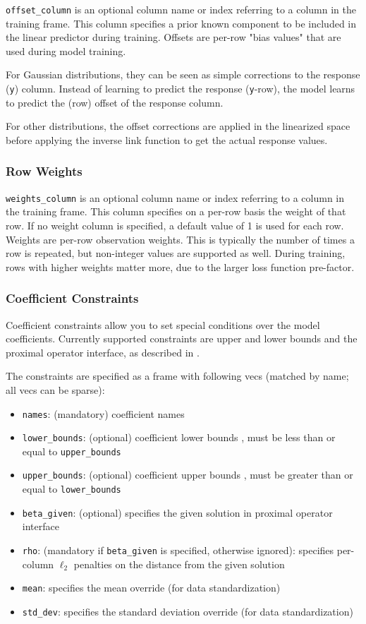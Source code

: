 \texttt{offset\_column} is an optional column name or index referring to a column in the training frame. This column specifies a prior known component to be included in the linear predictor during training. Offsets are per-row "bias values" that are used during model training. 

For Gaussian distributions, they can be seen as simple corrections to the response (\texttt{y}) column. Instead of learning to predict the response (\texttt{y}-row), the model learns to predict the (row) offset of the response column. 

For other distributions, the offset corrections are applied in the linearized space before applying the inverse link function to get the actual response values.  

\subsubsection{Row Weights}
\texttt{weights\_column} is an optional column name or index referring to a column in the training frame. This column specifies on a per-row basis the weight of that row.  If no weight column is specified, a default value of 1 is used for each row. Weights are per-row observation weights. This is typically the number of times a row is repeated, but non-integer values are supported as well. During training, rows with higher weights matter more, due to the larger loss function pre-factor.

\subsubsection{Coefficient Constraints}
Coefficient constraints allow you to set special conditions over the model coefficients. Currently supported
constraints are upper and lower bounds and the proximal operator interface, as described in .

The constraints are specified as a frame with following vecs (matched by name; all vecs can be sparse):

\begin{itemize}
\item \texttt{names}: (mandatory) coefficient names
\item \texttt{lower\_bounds}: (optional) coefficient lower bounds , must be less than or equal to \texttt{upper\_bounds}
\item \texttt{upper\_bounds}: (optional) coefficient upper bounds , must be greater than or equal to \texttt{lower\_bounds}
\item \texttt{beta\_given}: (optional) specifies the given solution in proximal operator interface
\item \texttt{rho}: (mandatory if \texttt{beta\_given} is specified, otherwise ignored): specifies per-column  $\ell_2$ penalties on the distance from the given solution
\item \texttt{mean}: specifies the mean override (for data standardization)
\item \texttt{std\_dev}: specifies the standard deviation override (for data standardization)
\end{itemize}
 
